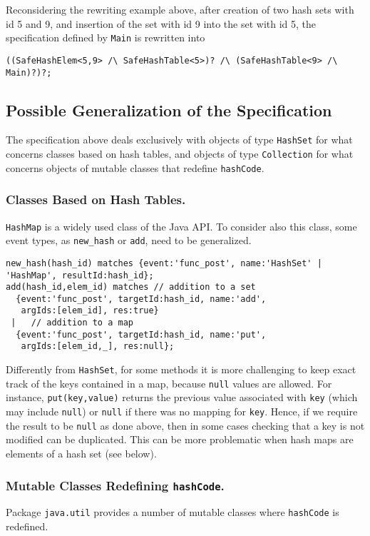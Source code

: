 Reconsidering the rewriting example above, after creation of two hash sets with id 5 and 9, and insertion
of the set with id 9 into the set with id 5, the specification defined by \lstinline{Main} is rewritten into
\begin{lstlisting}[basicstyle=\ttfamily\scriptsize]
((SafeHashElem<5,9> /\ SafeHashTable<5>)? /\ (SafeHashTable<9> /\ Main)?)?;
\end{lstlisting}

\subsection{Possible Generalization of the Specification}

The specification above deals exclusively with objects of type \lstinline{HashSet} for what concerns classes based on hash tables,
and objects of type \lstinline{Collection} for what concerns objects of mutable classes that redefine \lstinline{hashCode}. 

\subsubsection{Classes Based on Hash Tables.}
\lstinline{HashMap} is a widely used class of the Java API. To consider also this class,
some event types, as \lstinline{new_hash} or \lstinline{add}, need to be generalized. 
\begin{lstlisting}[basicstyle=\ttfamily\scriptsize]
new_hash(hash_id) matches {event:'func_post', name:'HashSet' | 'HashMap', resultId:hash_id};
add(hash_id,elem_id) matches // addition to a set
  {event:'func_post', targetId:hash_id, name:'add',  
   argIds:[elem_id], res:true}
 |   // addition to a map  
  {event:'func_post', targetId:hash_id, name:'put',  
   argIds:[elem_id,_], res:null};
\end{lstlisting}
Differently from \lstinline{HashSet}, for some methods it is more challenging to keep exact track of the keys contained in a map, because \lstinline{null} values are allowed. For instance, \lstinline{put(key,value)} returns the previous value associated
with \lstinline{key} (which may include \lstinline{null}) or \lstinline{null} if there was no mapping for \lstinline{key}.
Hence, if we require the result to be \lstinline{null} as done above, then in some cases checking that a key is not modified can be duplicated.
This can be more problematic when hash maps are elements of a hash set (see below).

\subsubsection{Mutable Classes Redefining \lstinline{hashCode}.} 
Package \lstinline{java.util} provides a number of mutable classes where \lstinline{hashCode} is redefined.

